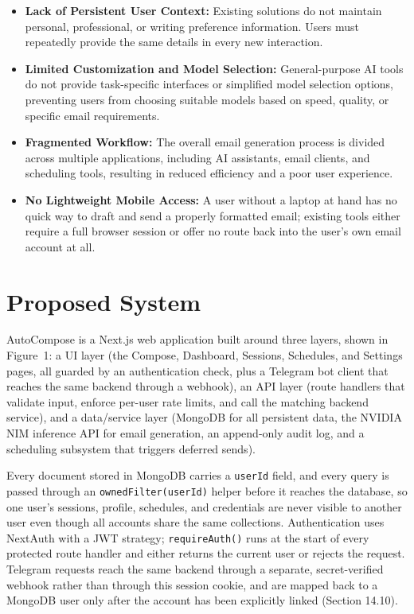 \documentclass[12pt,a4paper]{article}
\begin{document}
\begin{itemize}[leftmargin=22pt]
\item \textbf{Lack of Persistent User Context:} Existing solutions do not maintain personal, professional, or writing preference information. Users must repeatedly provide the same details in every new interaction.


\item \textbf{Limited Customization and Model Selection:} General-purpose AI tools do not provide task-specific interfaces or simplified model selection options, preventing users from choosing suitable models based on speed, quality, or specific email requirements.

\item \textbf{Fragmented Workflow:} The overall email generation process is divided across multiple applications, including AI assistants, email clients, and scheduling tools, resulting in reduced efficiency and a poor user experience.

\item \textbf{No Lightweight Mobile Access:} A user without a laptop at hand has no quick way to draft and send a properly formatted email; existing tools either require a full browser session or offer no route back into the user's own email account at all.

\end{itemize}


\section{Proposed System}

AutoCompose is a Next.js web application built around three layers, shown in Figure~1: a UI layer (the Compose, Dashboard, Sessions, Schedules, and Settings pages, all guarded by an authentication check, plus a Telegram bot client that reaches the same backend through a webhook), an API layer (route handlers that validate input, enforce per-user rate limits, and call the matching backend service), and a data/service layer (MongoDB for all persistent data, the NVIDIA NIM inference API for email generation, an append-only audit log, and a scheduling subsystem that triggers deferred sends).

Every document stored in MongoDB carries a \texttt{userId} field, and every query is passed through an \texttt{ownedFilter(userId)} helper before it reaches the database, so one user's sessions, profile, schedules, and credentials are never visible to another user even though all accounts share the same collections. Authentication uses NextAuth with a JWT strategy; \texttt{requireAuth()} runs at the start of every protected route handler and either returns the current user or rejects the request. Telegram requests reach the same backend through a separate, secret-verified webhook rather than through this session cookie, and are mapped back to a MongoDB user only after the account has been explicitly linked (Section 14.10).
\end{document}
